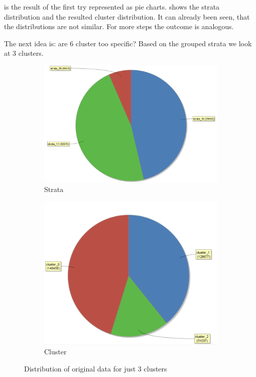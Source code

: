  is the result of the first try represented as pie charts.  shows the strata distribution and  the resulted cluster distribution. It can already been seen, that the distributions are not similar. For more steps the outcome is analogous.

The next idea is: are 6 cluster too specific? Based on the grouped strata we look at 3 clusters.

\begin{figure}[H]
\centering
\begin{subfigure}{.4\textwidth}
  \centering
  \includegraphics[width=.8\linewidth]{ClusterOrigRapidStrata2Cluster.PNG}
  \caption{Strata}
  \label{fig:OrgSt3}
\end{subfigure}%
\begin{subfigure}{.35\textwidth}
  \centering
  \includegraphics[width=.8\linewidth]{ClusterOrigRapidCluster2Cluster.PNG}
  \caption{Cluster}
  \label{fig:OrgCl3}
\end{subfigure}
\caption{Distribution of original data for just 3 clusters}
\label{fig:OrgDist3Cl}
\end{figure}

